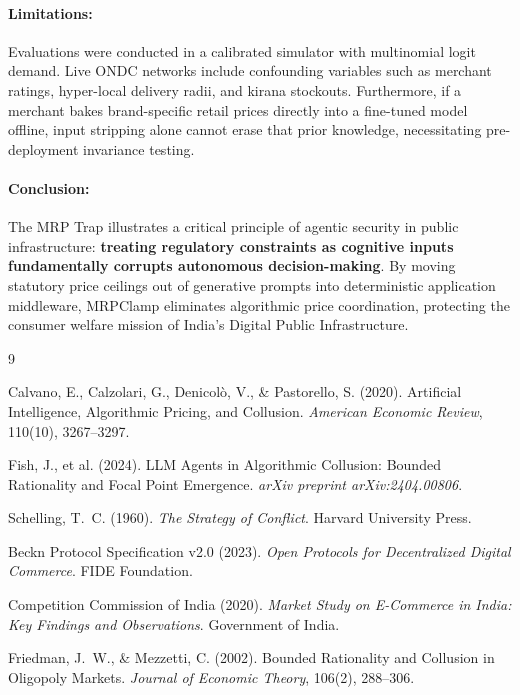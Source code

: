 \documentclass[11pt,a4paper]{article}
\begin{document}
\paragraph{Limitations:} Evaluations were conducted in a calibrated simulator with multinomial logit demand. Live ONDC networks include confounding variables such as merchant ratings, hyper-local delivery radii, and kirana stockouts. Furthermore, if a merchant bakes brand-specific retail prices directly into a fine-tuned model offline, input stripping alone cannot erase that prior knowledge, necessitating pre-deployment invariance testing.

\paragraph{Conclusion:} The MRP Trap illustrates a critical principle of agentic security in public infrastructure: \textbf{treating regulatory constraints as cognitive inputs fundamentally corrupts autonomous decision-making}. By moving statutory price ceilings out of generative prompts into deterministic application middleware, MRPClamp eliminates algorithmic price coordination, protecting the consumer welfare mission of India's Digital Public Infrastructure.

\begin{thebibliography}{9}

Calvano, E., Calzolari, G., Denicol\`{o}, V., \& Pastorello, S. (2020).
\newblock Artificial Intelligence, Algorithmic Pricing, and Collusion.
\newblock \emph{American Economic Review}, 110(10), 3267--3297.

Fish, J., et al. (2024).
\newblock LLM Agents in Algorithmic Collusion: Bounded Rationality and Focal Point Emergence.
\newblock \emph{arXiv preprint arXiv:2404.00806}.

Schelling, T.~C. (1960).
\newblock \emph{The Strategy of Conflict}.
\newblock Harvard University Press.

Beckn Protocol Specification v2.0 (2023).
\newblock \emph{Open Protocols for Decentralized Digital Commerce}.
\newblock FIDE Foundation.

Competition Commission of India (2020).
\newblock \emph{Market Study on E-Commerce in India: Key Findings and Observations}.
\newblock Government of India.

Friedman, J.~W., \& Mezzetti, C. (2002).
\newblock Bounded Rationality and Collusion in Oligopoly Markets.
\newblock \emph{Journal of Economic Theory}, 106(2), 288--306.

\end{thebibliography}
\end{document}
